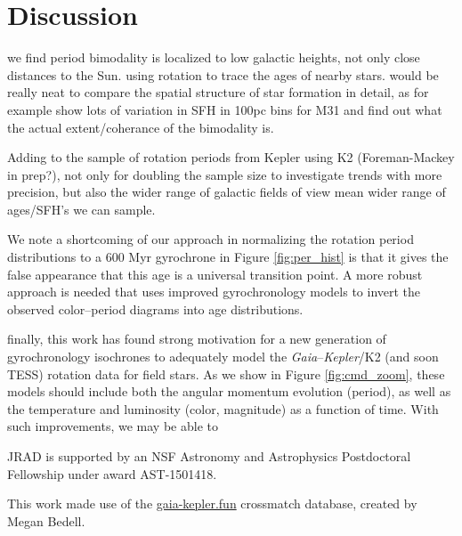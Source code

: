 \documentclass[preprint2]{aastex62}
\newcommand{\Kepler}{\textsl{Kepler}\xspace}
\begin{document}
\section{Discussion}

%

we find period bimodality is localized to low galactic heights, not only close distances to the Sun.
using rotation to trace the ages of nearby stars. would be really neat to compare the spatial structure of star formation in detail, as 
\citet{lewis2015} for example show lots of variation in SFH in 100pc bins for M31
and find out what the actual extent/coherance of the bimodality is. 

Adding to the sample of rotation periods from Kepler using K2 (Foreman-Mackey in prep?), not only for doubling the sample size to investigate trends with more precision, but also the wider range of galactic fields of view mean wider range of ages/SFH's we can sample. 

We note a shortcoming of our approach in normalizing the rotation period distributions to a 600 Myr gyrochrone in Figure \ref{fig:per_hist} is that it gives the false appearance that this age is a universal transition point. A more robust approach is needed that uses improved gyrochronology models to invert the observed color--period diagrams into age distributions. 


finally, this work has found strong motivation for a new generation of gyrochronology isochrones to adequately model the {\em Gaia}--\Kepler/K2 (and soon TESS) rotation data for field stars. As we show in Figure \ref{fig:cmd_zoom}, these models should include both the angular momentum evolution (period), as well as the temperature and luminosity (color, magnitude) as a function of time. With such improvements, we may be able to 



\acknowledgments

JRAD is supported by an NSF Astronomy and Astrophysics Postdoctoral Fellowship under award AST-1501418. 

This work made use of the \url{gaia-kepler.fun} crossmatch database, created by Megan Bedell.
\end{document}
